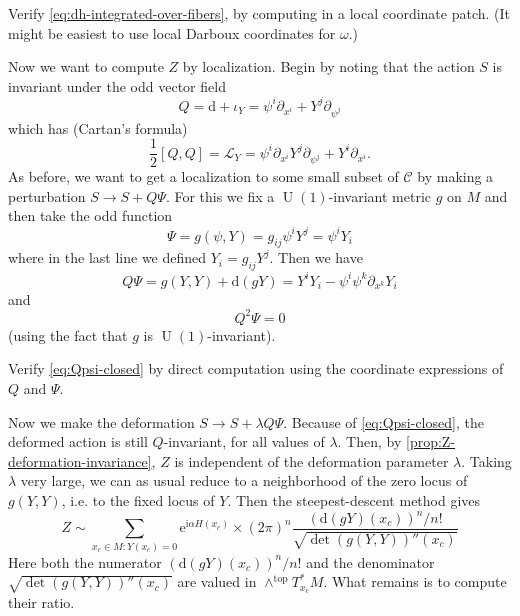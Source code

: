 \documentclass[12pt,letterpaper,reqno]{article}
\numberwithin{equation}{section}
\newcommand{\cC}{\ensuremath{\mathcal C}}
\newcommand{\cL}{\ensuremath{\mathcal L}}
\newcommand{\half}{\ensuremath{\frac{1}{2}}}
\newcommand{\I}{{\mathrm i}}
\newcommand{\e}{{\mathrm e}}
\newcommand{\de}{\mathrm{d}}
\newcommand{\rmtop}{\mathrm{top}}
\DeclareMathOperator{\U}{U}
\newcommand{\fixme}[1]{{\color{orange}{[#1]}}}
\begin{document}
\begin{exercise} Verify \eqref{eq:dh-integrated-over-fibers}, by 
computing in a local coordinate patch. (It might be easiest to use 
local Darboux coordinates for $\omega$.)
\end{exercise}

Now we want to compute $Z$ by localization.
Begin by noting that the action $S$ is invariant under the odd vector field
\begin{equation}
  Q = \de + \iota_Y = \psi^i \partial_{x^i} + Y^j \partial_{\psi^j}
\end{equation}
which has (Cartan's formula)
\begin{equation}
  \half [Q,Q] = \cL_Y = \psi^i \partial_{x^i} Y^j \partial_{\psi^j} + Y^i \partial_{x^i}.
\end{equation}
As before, we want to get a localization to some small subset of
$\cC$ by making a perturbation $S \to S + Q \Psi$.
For this we fix a $\U(1)$-invariant metric $g$ on $M$ and then 
take the odd function
\begin{equation}
  \Psi = g(\psi, Y) = g_{ij} \psi^i Y^j = \psi^i Y_i
\end{equation}
where in the last line we defined $Y_i = g_{ij} Y^j$.
Then we have
\begin{equation}
  Q \Psi = g(Y,Y) + \de(gY) = Y^i Y_i - \psi^i \psi^k \partial_{x^k} Y_i
\end{equation}
and 
\begin{equation} \label{eq:Qpsi-closed}
  Q^2 \Psi = 0
\end{equation}
(using the fact that $g$ is $\U(1)$-invariant).
\begin{exercise} Verify \eqref{eq:Qpsi-closed} by direct computation
using the coordinate expressions of $Q$ and $\Psi$.
\end{exercise}

Now we make the deformation $S \to S + \lambda Q \Psi$.
Because of \eqref{eq:Qpsi-closed}, the deformed action is 
still $Q$-invariant, for all values of $\lambda$.
Then, by \autoref{prop:Z-deformation-invariance},
$Z$ is independent of the deformation parameter $\lambda$.
Taking $\lambda$ very large, we can as usual 
reduce to a neighborhood of the zero locus of $g(Y,Y)$, i.e. to the fixed locus of $Y$. Then the steepest-descent method gives
\begin{equation} \label{eq:dh-steepest-descent}
  Z \sim \sum_{x_c \in M: Y(x_c) = 0} \e^{\I \alpha H(x_c)} \times (2\pi)^n \frac{(\de(gY)(x_c))^n/n!}{\sqrt{\det (g(Y,Y))''(x_c)}}
\end{equation}
Here both the numerator
$(\de(gY)(x_c))^n/n!$
and the denominator
$\sqrt{\det (g(Y,Y))''(x_c)}$ 
are valued in $\wedge^\rmtop T^*_{x_c} M$.
\fixme{it would be nicer to be careful about 
twists by orientation bundle here; we always
use the standard orientation to avoid having to worry about it}
What remains is to compute their ratio.
\end{document}
